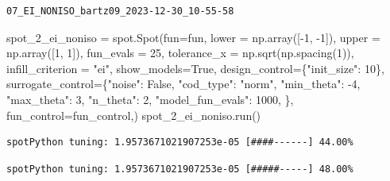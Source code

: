 \documentclass[
  letterpaper,
  DIV=11,
  numbers=noendperiod]{scrreprt}
\newenvironment{Shaded}{\begin{snugshade}}{\end{snugshade}}
\newcommand{\DecValTok}[1]{\textcolor[rgb]{0.68,0.00,0.00}{#1}}
\newcommand{\NormalTok}[1]{\textcolor[rgb]{0.00,0.23,0.31}{#1}}
\newcommand{\OperatorTok}[1]{\textcolor[rgb]{0.37,0.37,0.37}{#1}}
\newcommand{\StringTok}[1]{\textcolor[rgb]{0.13,0.47,0.30}{#1}}
\newcommand{\VariableTok}[1]{\textcolor[rgb]{0.07,0.07,0.07}{#1}}
\begin{document}
\begin{verbatim}
07_EI_NONISO_bartz09_2023-12-30_10-55-58
\end{verbatim}

\begin{Shaded}
\begin{Highlighting}[]
\NormalTok{spot\_2\_ei\_noniso }\OperatorTok{=}\NormalTok{ spot.Spot(fun}\OperatorTok{=}\NormalTok{fun,}
\NormalTok{                   lower }\OperatorTok{=}\NormalTok{ np.array([}\OperatorTok{{-}}\DecValTok{1}\NormalTok{, }\OperatorTok{{-}}\DecValTok{1}\NormalTok{]),}
\NormalTok{                   upper }\OperatorTok{=}\NormalTok{ np.array([}\DecValTok{1}\NormalTok{, }\DecValTok{1}\NormalTok{]),}
\NormalTok{                   fun\_evals }\OperatorTok{=} \DecValTok{25}\NormalTok{,}
\NormalTok{                   tolerance\_x }\OperatorTok{=}\NormalTok{ np.sqrt(np.spacing(}\DecValTok{1}\NormalTok{)),}
\NormalTok{                   infill\_criterion }\OperatorTok{=} \StringTok{"ei"}\NormalTok{,}
\NormalTok{                   show\_models}\OperatorTok{=}\VariableTok{True}\NormalTok{,}
\NormalTok{                   design\_control}\OperatorTok{=}\NormalTok{\{}\StringTok{"init\_size"}\NormalTok{: }\DecValTok{10}\NormalTok{\},}
\NormalTok{                   surrogate\_control}\OperatorTok{=}\NormalTok{\{}\StringTok{"noise"}\NormalTok{: }\VariableTok{False}\NormalTok{,}
                                      \StringTok{"cod\_type"}\NormalTok{: }\StringTok{"norm"}\NormalTok{,}
                                      \StringTok{"min\_theta"}\NormalTok{: }\OperatorTok{{-}}\DecValTok{4}\NormalTok{,}
                                      \StringTok{"max\_theta"}\NormalTok{: }\DecValTok{3}\NormalTok{,}
                                      \StringTok{"n\_theta"}\NormalTok{: }\DecValTok{2}\NormalTok{,}
                                      \StringTok{"model\_fun\_evals"}\NormalTok{: }\DecValTok{1000}\NormalTok{,}
\NormalTok{                                      \},}
\NormalTok{                    fun\_control}\OperatorTok{=}\NormalTok{fun\_control,)}
\NormalTok{spot\_2\_ei\_noniso.run()}
\end{Highlighting}
\end{Shaded}

\begin{verbatim}
spotPython tuning: 1.9573671021907253e-05 [####------] 44.00% 
\end{verbatim}

\begin{verbatim}
spotPython tuning: 1.9573671021907253e-05 [#####-----] 48.00% 
\end{verbatim}
\end{document}
